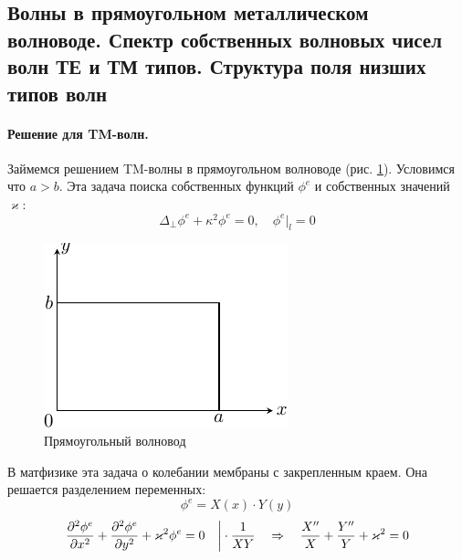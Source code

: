 \subsection{Волны в прямоугольном металлическом волноводе. Спектр собственных волновых чисел волн ТЕ и ТМ типов. Структура поля низших типов волн}


\paragraph{Решение для TM-волн.} Займемся решением TM-волны в прямоугольном волноводе (рис. \ref{fig:lect4:7}). Условимся что $a>b$. Эта задача поиска собственных функций $\phi^e$ и собственных значений $\varkappa$:
\begin{equation}
	\Delta_\perp \phi^e+\kappa^2\phi^e=0, \quad \phi^e|_l=0
\end{equation}

\begin{figure}[h!]
	\centering
	\includegraphics[scale=1.5]{img/lect4_ris7}
	\caption{Прямоугольный волновод}
	\label{fig:lect4:7}
\end{figure}

В матфизике эта задача о колебании мембраны с закрепленным краем. Она решается разделением переменных:
\begin{equation}
	\phi^e=X(x)\cdot Y(y)
\end{equation}
\begin{equation}
	\pdv[2]{\phi^e}{x}
		+\pdv[2]{\phi^e}{y}
			+\varkappa^2 \phi^e =0  \quad \bigg| \cdot \frac{1}{XY}
	\quad \Rightarrow \quad
		\frac{X''}{X}+\frac{Y''}{Y}+\varkappa^2=0
\end{equation}

